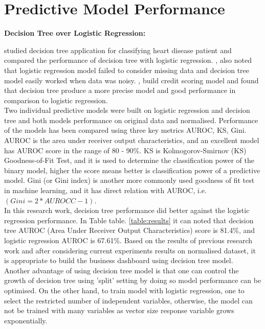 \section{Predictive Model Performance}
\textbf{Decision Tree over Logistic Regression:}

\cite{long1993comparison} studied decision tree application for classifying heart disease patient and compared the performance of decision tree with logistic regression. \cite{long1993comparison}, also noted that logistic regression model failed to consider missing data and decision tree model easily worked when data was noisy. \cite{satchidananda2006comparing}, build credit scoring model and found that decision tree produce a more precise model and good performance in comparison to logistic regression.\\

Two individual predictive models were built on logistic regression and decision tree and both models performance on original data and normalised. Performance of the models has been compared using three key metrics AUROC, KS, Gini. AUROC is the area under receiver output characteristics, and an excellent model has AUROC score in the range of 80 - 90\%. KS is Kolmogorov-Smirnov (KS) Goodness-of-Fit Test, and it is used to determine the classification power of the binary model, higher the score means better is classification power of a predictive model. Gini (or Gini index) is another more commonly used goodness of fit test in machine learning, and it has direct relation with AUROC, i.e. $(Gini = 2*AUROCC - 1)$.\\

In this research work, decision tree performance did better against the logistic regression performance. In Table table. \ref{table:results} it can noted that decision tree AUROC (Area Under Receiver Output Characteristics) score is 81.4\%, and logistic regression AUROC is 67.61\%. Based on the results of previous research work and after considering current experiments results on normalised dataset, it is appropriate to build the business dashboard using decision tree model.\\

Another advantage of using decision tree model is that one can control the growth of decision tree using 'split' setting by doing so model performance can be optimised. On the other hand,  to train model with logistic regression, one to select the restricted number of independent variables, otherwise, the model can not be trained with many variables as vector size response variable grows exponentially.


